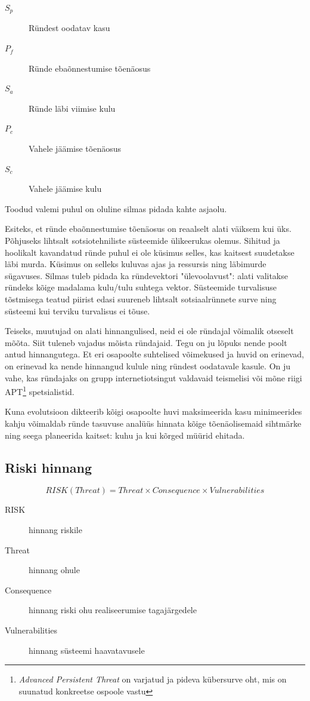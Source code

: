 \documentclass{tufte-book}
\begin{document}
	\begin{description}
		\item[$S_p$] Ründest oodatav kasu
		\item[$P_f$] Ründe ebaõnnestumise tõenäosus
		\item[$S_a$] Ründe läbi viimise kulu
		\item[$P_c$] Vahele jäämise tõenäosus
		\item[$S_c$] Vahele jäämise kulu
	\end{description}

Toodud valemi puhul on oluline silmas pidada kahte asjaolu. 

Esiteks, et ründe ebaõnnestumise tõenäosus on reaalselt alati väiksem kui üks. Põhjuseks lihtsalt sotsiotehniliste süsteemide ülikeerukas olemus. Sihitud ja hoolikalt kavandatud ründe puhul ei ole küsimus selles, kas kaitsest suudetakse läbi murda. Küsimus on selleks kuluvas ajas ja ressursis ning läbimurde sügavuses. Silmas tuleb pidada ka ründevektori "ülevoolavust": alati valitakse ründeks kõige madalama kulu/tulu suhtega vektor. Süsteemide turvalisuse tõstmisega teatud piirist edasi suureneb lihtsalt sotsiaalrünnete surve ning süsteemi kui terviku turvalisus ei tõuse. 

Teiseks, muutujad on alati hinnangulised, neid ei ole ründajal võimalik otseselt mõõta. Siit tuleneb vajadus mõista ründajaid. Tegu on ju lõpuks nende poolt antud hinnangutega. Et eri osapoolte suhtelised võimekused ja huvid on erinevad, on erinevad ka nende hinnangud kulule ning ründest oodatavale kasule. On ju vahe, kas ründajaks on grupp internetiotsingut valdavaid teismelisi või mõne riigi APT\footnote{\emph{Advanced Persistent Threat} on varjatud ja pideva kübersurve oht, mis on suunatud konkreetse ospoole vastu} spetsialistid. 

Kuna evolutsioon dikteerib kõigi osapoolte huvi maksimeerida kasu minimeerides kahju võimaldab ründe tasuvuse analüüs hinnata kõige tõenäolisemaid sihtmärke ning seega planeerida kaitset: kuhu ja kui kõrged müürid ehitada. 

\subsection{Riski hinnang}

\begin{equation}
	RISK(Threat) = Threat \times Consequence \times Vulnerabilities
	\label{eq:risk}
\end{equation}

\begin{description}
	\item[RISK] hinnang riskile
	\item[Threat] hinnang ohule
	\item[Consequence] hinnang riski ohu realiseerumise tagajärgedele
	\item[Vulnerabilities] hinnang süsteemi haavatavusele
\end{description}
\end{document}
